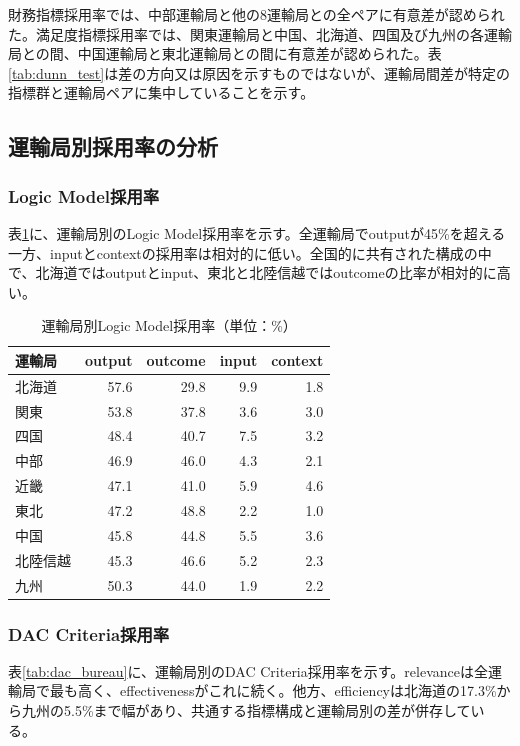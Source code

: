 財務指標採用率では、中部運輸局と他の8運輸局との全ペアに有意差が認められた。満足度指標採用率では、関東運輸局と中国、北海道、四国及び九州の各運輸局との間、中国運輸局と東北運輸局との間に有意差が認められた。表\ref{tab:dunn_test}は差の方向又は原因を示すものではないが、運輸局間差が特定の指標群と運輸局ペアに集中していることを示す。

\subsection{運輸局別採用率の分析}

\subsubsection{Logic Model採用率}

表\ref{tab:logic_model_bureau}に、運輸局別のLogic Model採用率を示す。全運輸局でoutputが45\%を超える一方、inputとcontextの採用率は相対的に低い。全国的に共有された構成の中で、北海道ではoutputとinput、東北と北陸信越ではoutcomeの比率が相対的に高い。

\begin{table}[htbp]
\caption{運輸局別Logic Model採用率（単位：\%）}
\label{tab:logic_model_bureau}
\centering
\begin{tabular}{lrrrr}
\toprule
運輸局 & output & outcome & input & context \\
\midrule
北海道 & 57.6 & 29.8 & 9.9 & 1.8 \\
関東 & 53.8 & 37.8 & 3.6 & 3.0 \\
四国 & 48.4 & 40.7 & 7.5 & 3.2 \\
中部 & 46.9 & 46.0 & 4.3 & 2.1 \\
近畿 & 47.1 & 41.0 & 5.9 & 4.6 \\
東北 & 47.2 & 48.8 & 2.2 & 1.0 \\
中国 & 45.8 & 44.8 & 5.5 & 3.6 \\
北陸信越 & 45.3 & 46.6 & 5.2 & 2.3 \\
九州 & 50.3 & 44.0 & 1.9 & 2.2 \\
\bottomrule
\end{tabular}
\end{table}

\subsubsection{DAC Criteria採用率}

表\ref{tab:dac_bureau}に、運輸局別のDAC Criteria採用率を示す。relevanceは全運輸局で最も高く、effectivenessがこれに続く。他方、efficiencyは北海道の17.3\%から九州の5.5\%まで幅があり、共通する指標構成と運輸局別の差が併存している。

